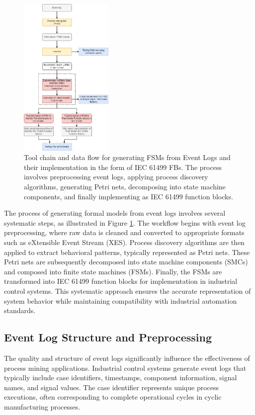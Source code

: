 \begin{figure}[!t]
	\centering
	\includegraphics[width=0.4\textwidth]{chapters/images/chapter4/Methodology.png}
	\caption{Tool chain and data flow for generating FSMs from Event Logs and their implementation in the form of IEC 61499 FBs. The process involves preprocessing event logs, applying process discovery algorithms, generating Petri nets, decomposing into state machine components, and finally implementing as IEC 61499 function blocks.}
	\label{monitorFlowchart}
\end{figure}

The process of generating formal models from event logs involves several systematic steps, as illustrated in Figure \ref{monitorFlowchart}. The workflow begins with event log preprocessing, where raw data is cleaned and converted to appropriate formats such as eXtensible Event Stream (XES). Process discovery algorithms are then applied to extract behavioral patterns, typically represented as Petri nets. These Petri nets are subsequently decomposed into state machine components (SMCs) and composed into finite state machines (FSMs). Finally, the FSMs are transformed into IEC 61499 function blocks for implementation in industrial control systems. This systematic approach ensures the accurate representation of system behavior while maintaining compatibility with industrial automation standards.

\subsection{Event Log Structure and Preprocessing}

The quality and structure of event logs significantly influence the effectiveness of process mining applications. Industrial control systems generate event logs that typically include case identifiers, timestamps, component information, signal names, and signal values. The case identifier represents unique process executions, often corresponding to complete operational cycles in cyclic manufacturing processes.

